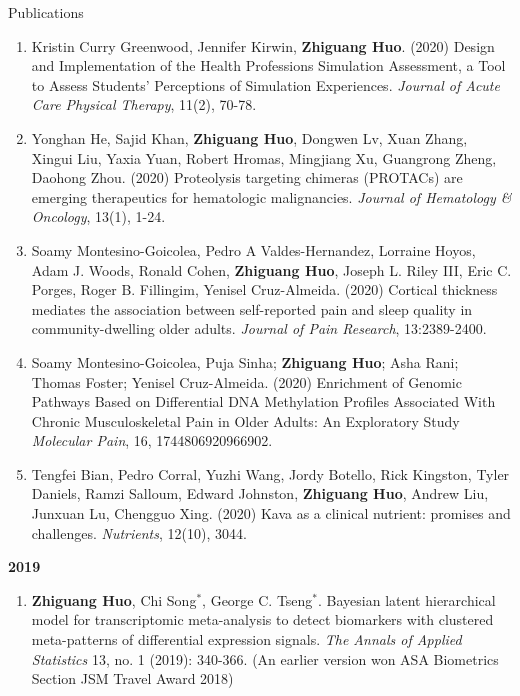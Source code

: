 \documentclass{resume} %
\begin{document}
\begin{rSection}{Publications}
\begin{enumerate}[noitemsep,topsep=0pt, resume]
\item
Kristin Curry Greenwood,  Jennifer Kirwin, {\bf Zhiguang Huo}. (2020)
Design and Implementation of the Health Professions Simulation Assessment, a Tool to Assess Students' Perceptions of Simulation Experiences. \emph{Journal of Acute Care Physical Therapy}, 11(2), 70-78.


 
\item
Yonghan He, Sajid Khan, {\bf Zhiguang Huo}, Dongwen Lv, Xuan Zhang, Xingui Liu, Yaxia Yuan, Robert Hromas, Mingjiang Xu, Guangrong Zheng, Daohong Zhou. (2020)
Proteolysis targeting chimeras (PROTACs) are emerging therapeutics for hematologic malignancies.
\emph{Journal of Hematology \& Oncology}, 13(1), 1-24.

\item  
Soamy Montesino-Goicolea, Pedro A Valdes-Hernandez,  Lorraine Hoyos, Adam J. Woods, Ronald Cohen,  {\bf Zhiguang Huo}, Joseph L. Riley III, Eric C. Porges, Roger B. Fillingim, Yenisel Cruz-Almeida. (2020)
Cortical thickness mediates the association between self-reported pain and sleep quality in community-dwelling older adults. 
\emph{Journal of Pain Research}, 13:2389-2400.


\item
Soamy Montesino-Goicolea, Puja Sinha; {\bf Zhiguang Huo}; Asha Rani; Thomas Foster; Yenisel Cruz-Almeida. (2020)
Enrichment of Genomic Pathways Based on Differential DNA Methylation Profiles Associated With Chronic Musculoskeletal Pain in Older Adults: An Exploratory Study
\emph{Molecular Pain}, 16, 1744806920966902.

\item  
Tengfei Bian, Pedro Corral, Yuzhi Wang, Jordy Botello, Rick Kingston, Tyler Daniels, Ramzi Salloum, Edward Johnston, {\bf Zhiguang Huo}, Andrew Liu,  Junxuan Lu, Chengguo Xing. (2020)
Kava as a clinical nutrient: promises and challenges.
\emph{Nutrients}, 12(10), 3044.




\end{enumerate}


\textbf{2019}
\begin{enumerate}[noitemsep,topsep=0pt,resume]




\item 
{\bf Zhiguang Huo}, Chi Song$^*$, George C. Tseng$^*$. 
Bayesian latent hierarchical model for transcriptomic meta-analysis to detect biomarkers with clustered meta-patterns of differential expression signals. \emph{The Annals of Applied Statistics} 13, no. 1 (2019): 340-366. (An earlier version won ASA Biometrics Section JSM Travel Award 2018)



\end{enumerate}
\end{rSection}
\end{document}
